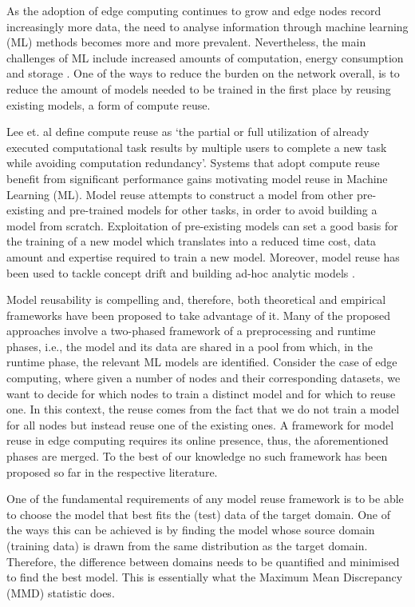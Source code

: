 \documentclass{mpaper}
\begin{document}
As the adoption of edge computing continues to grow and edge nodes record increasingly more data, the need to analyse information through machine learning (ML) methods \cite{ECDeepLearning, ECAI} becomes more and more prevalent. Nevertheless, the main challenges of ML include increased amounts of computation, energy consumption and storage \cite{MLChallenges}.  One of the ways to reduce the burden on the network overall, is to reduce the amount of models needed to be trained in the first place by reusing existing models, a form of compute reuse. 

Lee et. al \cite{ComputeReuse} define compute reuse as `the partial or full utilization of already executed computational task results by multiple users to complete a new task while avoiding computation redundancy'.  Systems that adopt compute reuse benefit from significant performance gains motivating model reuse in Machine Learning (ML). Model reuse \cite{Learnware} attempts to construct a model from other pre-existing and pre-trained models for other tasks, in order to avoid building a model from scratch. Exploitation of pre-existing models can set a good basis for the training of a new model which translates into a reduced time cost, data amount and expertise required to train a new model. Moreover, model reuse has been used to tackle concept drift \cite{ConceptDrift} and building ad-hoc analytic models \cite{MaterializationReuse}.

Model reusability is compelling and, therefore, both theoretical \cite{Learnware} and empirical \cite{MaterializationReuse, KernelMMD} frameworks have been proposed to take advantage of it. Many of the proposed approaches involve a two-phased framework of a preprocessing and runtime phases, i.e., the model and its data are shared in a pool from which, in the runtime phase, the relevant ML models are identified. Consider the case of edge computing, where given a number of nodes and their corresponding datasets, we want to decide for which nodes to train a distinct model and for which to reuse one. In this context, the reuse comes from the fact that we do not train a model for all nodes but instead reuse one of the existing ones. A framework for model reuse in edge computing requires its online presence, thus, the aforementioned phases are merged. To the best of our knowledge no such framework has been proposed so far in the respective literature.

One of the fundamental requirements of any model reuse framework is to be able to choose the model that best fits the (test) data of the target domain. One of the ways this can be achieved is by finding the model whose source domain (training data) is drawn from the same distribution as the target domain. Therefore, the difference between domains needs to be quantified and minimised to find the best model. This is essentially what the Maximum Mean Discrepancy (MMD) \cite{OriginalMMD} statistic does. 
\end{document}
